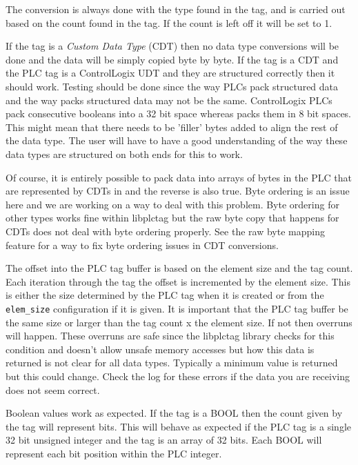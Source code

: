 The conversion is always done with the type found in the \opendax{} tag, and
is carried out based on the count found in the \opendax{} tag.  If the count
is left off it will be set to 1.

If the \opendax{} tag is a \textit{Custom Data Type} (CDT) then no data type
conversions will be done and the data will be simply copied byte by byte.  If
the \opendax{} tag is a CDT and the PLC tag is a ControlLogix UDT and they
are structured correctly then it should work.  Testing should be done since
the way PLCs pack structured data and the way \opendax{} packs structured
data may not be the same.  ControlLogix PLCs pack consecutive booleans into
a 32 bit space whereas \opendax{} packs them in 8 bit spaces.  This might mean
that there needs to be 'filler' bytes added to align the rest of the data
type.  The user will have to have a good understanding of the way these
data types are structured on both ends for this to work.

Of course, it is entirely possible to pack data into arrays of bytes in
the PLC that are represented by CDTs in \opendax{} and the reverse is
also true.  Byte ordering is an issue here and we are working on a way
to deal with this problem.  Byte ordering for other types works fine
within libplctag but the raw byte copy that happens for CDTs does not
deal with byte ordering properly.  See the raw byte mapping feature
for a way to fix byte ordering issues in CDT conversions.

The offset into the PLC tag buffer is based on the element size and the 
\opendax{} tag count.  Each iteration through the \opendax{} tag
the offset is incremented by the element size.  This is either the size determined
by the PLC tag when it is created or from the \texttt{elem\_size} configuration
if it is given.  It is important that the PLC tag buffer be the same size
or larger than the \opendax{} tag count x the element size.  If not then
overruns will happen.  These overruns are safe since the libplctag library
checks for this condition and doesn't allow unsafe memory accesses but
how this data is returned is not clear for all data types.  Typically
a minimum value is returned but this could change.  Check the \opendax{}
log for these errors if the data you are receiving does not seem correct.

Boolean values work as expected.  If the \opendax{} tag is a BOOL then
the count given by the tag will represent bits.  This will behave as expected
if the PLC tag is a single 32 bit unsigned integer and the \opendax{} tag is
an array of 32 bits.  Each \opendax{} BOOL will represent each bit position
within the PLC integer.

